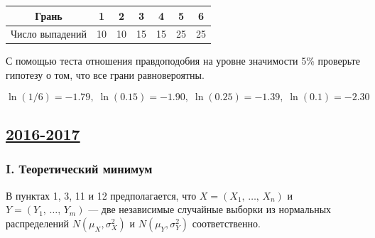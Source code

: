 \begin{enumerate}[resume]
			 \begin{center}
		\begin{tabular}{c|cccccc}
			\toprule
			Грань & 1 & 2 & 3 & 4 & 5 & 6\\
			\midrule
							Число выпадений & 10 & 10 & 15 & 15 & 25 & 25 \\
			\bottomrule
		\end{tabular}
	\end{center}

С помощью теста отношения правдоподобия на уровне значимости 5\% проверьте гипотезу о том, что все грани равновероятны.

\[
\ln(1/6)=-1.79, \; \ln(0.15)=-1.90, \; \ln(0.25)=-1.39, \; \ln(0.1)=-2.30
\]

\end{enumerate}


\newpage
\subsection[2016-2017]{\hyperref[sec:sol_kr_04_2016_2017]{2016-2017}}
\label{sec:kr_04_2016_2017}


\subsubsection*{I. Теоретический минимум}


В пунктах 1, 3, 11 и 12 предполагается, что $X = (X_1, \, \ldots, \, X_n)$ и
$Y = (Y_1, \, \ldots, \, Y_m)$ — две независимые случайные выборки из нормальных
распределений $N(\mu_X, \sigma_X^2)$ и $N(\mu_Y, \sigma_Y^2)$ соответственно.

